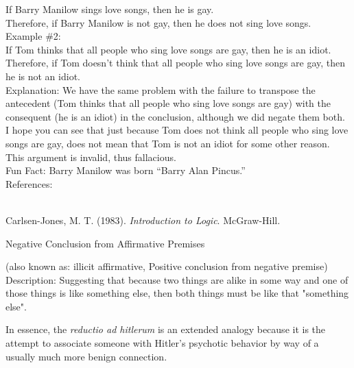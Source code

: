 \documentclass[a4paper,12pt,single,pdftex]{scrbook}
\begin{document}
    
      If Barry Manilow sings love songs, then he is gay.
    \\

    
      Therefore, if Barry Manilow is not gay, then he does not sing love songs.
    \\

    
      Example \#2:
    \\

    
      If Tom thinks that all people who sing love songs are gay, then he is an idiot.
    \\

    
      Therefore, if Tom doesn’t think that all people who sing love songs are gay, then he is not an idiot.
    \\

    
      Explanation: We have the same problem with the failure to transpose the antecedent (Tom thinks that all people who sing love songs are gay) with the consequent (he is an idiot) in the conclusion, although we did negate them both.  I hope you can see that just because Tom does not think all people who sing love songs are gay, does not mean that Tom is not an idiot for some other reason.  This argument is invalid, thus fallacious.
    \\

    
      Fun Fact: Barry Manilow was born “Barry Alan Pincus.”
    \\

    References:

    
      
        
      \\

      
        
          Carlsen-Jones, M. T. (1983). {\it Introduction to Logic}. McGraw-Hill.
        
      
    
  

Negative Conclusion from Affirmative Premises
    
      (also known as: illicit affirmative, Positive conclusion from negative premise)
    \\

  
    Description: Suggesting that because two things are alike in some way and one of those things is like something else, then both things must be like that "something else".

    
      In essence, the {\it reductio ad hitlerum} is an extended analogy because it is the attempt to associate someone with Hitler’s psychotic behavior by way of a usually much more benign connection.
    \\
\end{document}
